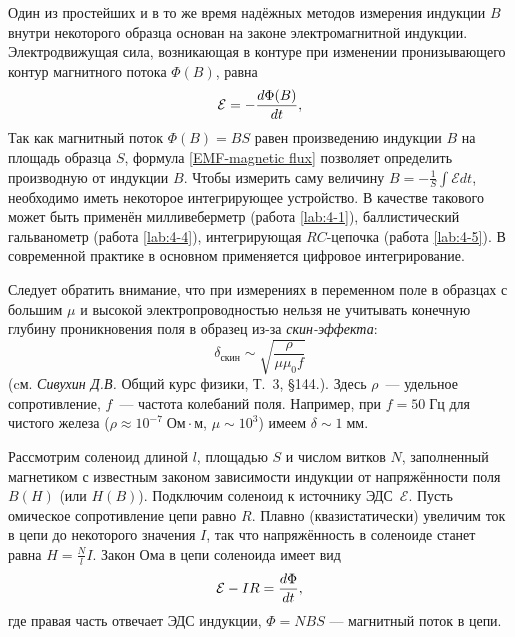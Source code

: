 
Один из простейших и в то же время надёжных методов измерения
индукции $B$ внутри некоторого образца основан
на законе электромагнитной индукции.
Электродвижущая сила, возникающая в контуре при изменении
пронизывающего контур магнитного потока $\Phi(B)$, равна
\begin{equation}
	\eqmark{EMF-magnetic flux}
	\mathcal{E} = - \frac{d\Phi (B)}{dt},
\end{equation}
Так как магнитный поток $\Phi (B)=BS$ равен произведению индукции $B$ на площадь
образца $S$, формула \eqref{EMF-magnetic flux} позволяет определить производную от
индукции $B$. Чтобы измерить саму величину $B=-\frac1{S}\int \mathcal{E} dt$,
необходимо иметь некоторое интегрирующее устройство.
В качестве такового может быть применён милливеберметр 
(работа \ref{lab:4-1}),
баллистический гальванометр (работа \ref{lab:4-4}), интегрирующая $RC$-цепочка
(работа \ref{lab:4-5}). 
В современной практике в основном применяется цифровое интегрирование.

\begin{lab:note}
Следует обратить внимание, что при измерениях в переменном поле
в образцах с большим $\mu$ и высокой электропроводностью
нельзя не учитывать конечную глубину
проникновения поля в образец из-за \emph{скин-эффекта}:
\begin{equation*}
\delta_{скин} \sim \sqrt{\frac{\rho}{\mu \mu_0 f}}
\end{equation*}
(cм. \textit{Сивухин Д.В.} Общий курс физики, Т.~3, \S 144.).
Здесь $\rho$~--- удельное сопротивление, $f$~--- частота колебаний поля.
Например, при $f=50\;Гц$ для чистого железа ($\rho \approx 10^{-7}\;Ом\cdot м$,
$\mu \sim 10^3$) имеем $\delta \sim 1\;мм$.
\end{lab:note}

\label{sec:forces}


Рассмотрим соленоид длиной $l$, площадью $S$ и числом витков $N$,
заполненный магнетиком с известным законом зависимости индукции от напряжённости
поля $B(H)$ (или $H(B)$). Подключим соленоид к источнику ЭДС~$\mathcal{E}$.
Пусть омическое сопротивление цепи равно $R$.
Плавно (квазистатически) увеличим ток в цепи до некоторого значения
$I$, так что напряжённость в соленоиде станет равна
$H = \frac{N}{l} I$. Закон Ома в цепи соленоида имеет вид
\begin{equation}
    \eqmark{OhmLaw-solenoid}
\mathcal{E} - IR = \frac{d\Phi}{dt},
\end{equation}
где правая часть отвечает ЭДС индукции, $\Phi = NBS$ --- магнитный поток в
цепи.

